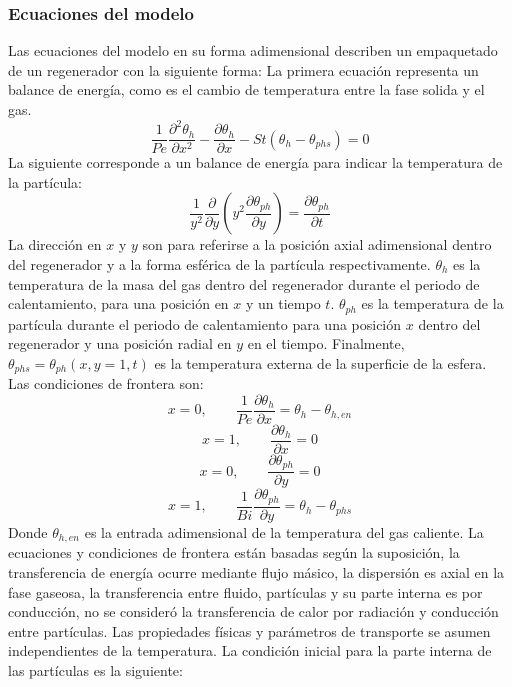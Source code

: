 \documentclass[12pt,letterpaper,final]{article}%
\begin{document}
\subsubsection*{Ecuaciones del modelo}
Las ecuaciones del modelo en su forma adimensional describen un empaquetado de un regenerador con la siguiente forma:
\newline
La primera ecuación representa un balance de energía, como es el cambio de temperatura entre la fase solida y el gas.
\begin{equation}
	\frac{1}{Pe}\frac{\partial ^2 \theta_h}{\partial x^2} - \frac{\partial \theta_h}{\partial x} - St(\theta_h -\theta_{phs}) = 0
\end{equation}
La siguiente corresponde a un balance de energía para indicar la temperatura de la partícula:
\begin{equation}
	\frac{1}{y^2}\frac{\partial}{\partial y}(y^2\frac{\partial \theta_{ph}}{\partial y}) = \frac{\partial \theta_{ph}}{\partial t} 
\end{equation}
La dirección en $x$ y $y$ son para referirse a la posición axial adimensional dentro del regenerador y a la forma esférica de la partícula respectivamente. $\theta_h$ es la temperatura de la masa del gas dentro del regenerador durante el periodo de calentamiento, para una posición en $x$ y un tiempo $t$. $\theta_{ph}$ es la temperatura de la partícula durante el periodo de calentamiento para una posición $x$ dentro del regenerador y una posición radial en $y$ en el tiempo. Finalmente, $\theta_{phs}=\theta_{ph}(x,y=1,t)$ es la temperatura externa de la superficie de la esfera.
\newline
Las condiciones de frontera son:
\begin{equation}
	x = 0, \qquad \frac{1}{Pe}\frac{\partial \theta_h}{\partial x} = \theta_h - \theta_{h,en}
\end{equation} 
\begin{equation}
	x = 1, \qquad \frac{\partial \theta_h}{\partial x} = 0
\end{equation}
\begin{equation}
	x = 0, \qquad \frac{\partial \theta_{ph}}{\partial y} = 0
\end{equation} 
\begin{equation}
	x = 1, \qquad \frac{1}{Bi}\frac{\partial \theta_{ph}}{\partial y} = \theta_h - \theta_{phs}
\end{equation}
Donde $\theta_{h,en}$ es la entrada adimensional de la temperatura del gas caliente. La ecuaciones y condiciones de frontera están basadas según la suposición, la transferencia de energía ocurre mediante flujo másico, la dispersión es axial en la fase gaseosa, la transferencia entre fluido, partículas y su parte interna es por conducción, no se consideró la transferencia de calor por radiación y conducción entre partículas. Las propiedades físicas y parámetros de transporte se asumen independientes de la temperatura. La condición inicial para la parte interna de las partículas es la siguiente:
\end{document}

